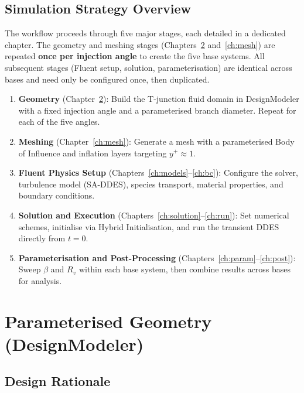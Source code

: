 \documentclass[12pt,a4paper]{report}
\begin{document}
\section{Simulation Strategy Overview}

The workflow proceeds through five major stages, each detailed in a dedicated
chapter.  The geometry and meshing stages (Chapters~\ref{ch:geom}
and~\ref{ch:mesh}) are repeated \textbf{once per injection angle} to create
the five base systems.  All subsequent stages (Fluent setup, solution,
parameterisation) are identical across bases and need only be configured once,
then duplicated.

\begin{enumerate}
  \item \textbf{Geometry} (Chapter~\ref{ch:geom}): Build the T-junction fluid
        domain in DesignModeler with a fixed injection angle and a
        parameterised branch diameter.  Repeat for each of the five angles.
  \item \textbf{Meshing} (Chapter~\ref{ch:mesh}): Generate a mesh with
        a parameterised Body of Influence and inflation layers targeting
        $y^+ \approx 1$.
  \item \textbf{Fluent Physics Setup} (Chapters~\ref{ch:models}--\ref{ch:bc}):
        Configure the solver, turbulence model (SA-DDES), species transport,
        material properties, and boundary conditions.
  \item \textbf{Solution and Execution} (Chapters~\ref{ch:solution}--\ref{ch:run}):
        Set numerical schemes, initialise via Hybrid Initialisation, and run the
        transient DDES directly from $t = 0$.
  \item \textbf{Parameterisation and Post-Processing}
        (Chapters~\ref{ch:param}--\ref{ch:post}): Sweep $\beta$ and $R_v$
        within each base system, then combine results across bases for
        analysis.
\end{enumerate}


\chapter{Parameterised Geometry (DesignModeler)}
\label{ch:geom}

\section{Design Rationale}
\end{document}
